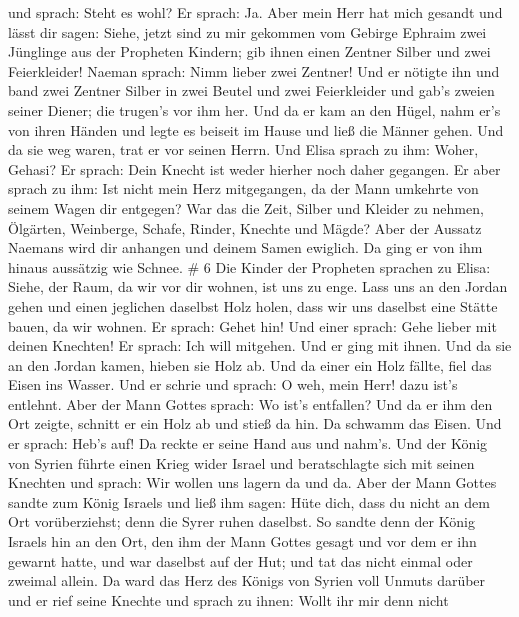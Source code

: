 und sprach: Steht es wohl?  Er sprach: Ja. Aber mein Herr
hat mich gesandt und lässt dir sagen: Siehe, jetzt sind zu mir gekommen
vom Gebirge Ephraim zwei Jünglinge aus der Propheten Kindern; gib ihnen
einen Zentner Silber und zwei Feierkleider!  Naeman sprach:
Nimm lieber zwei Zentner! Und er nötigte ihn und band zwei Zentner
Silber in zwei Beutel und zwei Feierkleider und gab's zweien seiner
Diener; die trugen's vor ihm her.  Und da er kam an den
Hügel, nahm er's von ihren Händen und legte es beiseit im Hause und ließ
die Männer gehen.  Und da sie weg waren, trat er vor seinen
Herrn. Und Elisa sprach zu ihm: Woher, Gehasi? Er sprach: Dein Knecht
ist weder hierher noch daher gegangen.  Er aber sprach zu
ihm: Ist nicht mein Herz mitgegangen, da der Mann umkehrte von seinem
Wagen dir entgegen? War das die Zeit, Silber und Kleider zu nehmen,
Ölgärten, Weinberge, Schafe, Rinder, Knechte und Mägde? 
Aber der Aussatz Naemans wird dir anhangen und deinem Samen ewiglich. Da
ging er von ihm hinaus aussätzig wie Schnee. \# 6  Die
Kinder der Propheten sprachen zu Elisa: Siehe, der Raum, da wir vor dir
wohnen, ist uns zu enge.  Lass uns an den Jordan gehen und
einen jeglichen daselbst Holz holen, dass wir uns daselbst eine Stätte
bauen, da wir wohnen. Er sprach: Gehet hin!  Und einer
sprach: Gehe lieber mit deinen Knechten! Er sprach: Ich will mitgehen.
 Und er ging mit ihnen. Und da sie an den Jordan kamen,
hieben sie Holz ab.  Und da einer ein Holz fällte, fiel das
Eisen ins Wasser. Und er schrie und sprach: O weh, mein Herr! dazu ist's
entlehnt.  Aber der Mann Gottes sprach: Wo ist's entfallen?
Und da er ihm den Ort zeigte, schnitt er ein Holz ab und stieß da hin.
Da schwamm das Eisen.  Und er sprach: Heb's auf! Da reckte
er seine Hand aus und nahm's.  Und der König von Syrien
führte einen Krieg wider Israel und beratschlagte sich mit seinen
Knechten und sprach: Wir wollen uns lagern da und da.  Aber
der Mann Gottes sandte zum König Israels und ließ ihm sagen: Hüte dich,
dass du nicht an dem Ort vorüberziehst; denn die Syrer ruhen daselbst.
 So sandte denn der König Israels hin an den Ort, den ihm
der Mann Gottes gesagt und vor dem er ihn gewarnt hatte, und war
daselbst auf der Hut; und tat das nicht einmal oder zweimal allein.
 Da ward das Herz des Königs von Syrien voll Unmuts darüber
und er rief seine Knechte und sprach zu ihnen: Wollt ihr mir denn nicht
